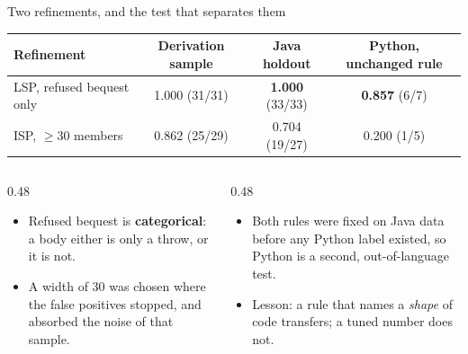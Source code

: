 \documentclass[11pt,aspectratio=169]{beamer}
\begin{document}
\begin{frame}{Two refinements, and the test that separates them}
\begin{center}
\small
\begin{tabular}{@{}lccc@{}}
\toprule
\textbf{Refinement} & \textbf{Derivation sample} & \textbf{Java holdout} & \textbf{Python, unchanged rule} \\
\midrule
LSP, refused bequest only & 1.000 (31/31) & \textbf{1.000} (33/33) & \textbf{0.857} (6/7) \\
ISP, $\geq$30 members & 0.862 (25/29) & 0.704 (19/27) & 0.200 (1/5) \\
\bottomrule
\end{tabular}
\end{center}
\vspace{6pt}
\begin{columns}[T,onlytextwidth]
\begin{column}{0.48\textwidth}
\begin{itemize}\setlength{\itemsep}{3pt}\small
  \item Refused bequest is \textbf{categorical}: a body either is only a throw, or it is not.
  \item A width of 30 was chosen where the false positives stopped, and absorbed the noise of that
        sample.
\end{itemize}
\end{column}
\begin{column}{0.48\textwidth}
\begin{itemize}\setlength{\itemsep}{3pt}\small
  \item Both rules were fixed on Java data before any Python label existed, so Python is a second,
        out-of-language test.
  \item Lesson: a rule that names a \emph{shape} of code transfers; a tuned number does not.
\end{itemize}
\end{column}
\end{columns}
\end{frame}
\end{document}
